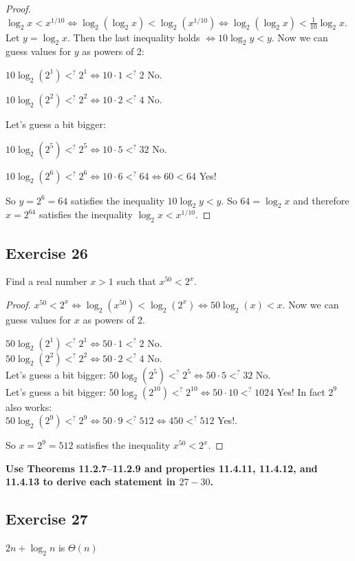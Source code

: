 \documentclass[14pt]{extarticle}
\newcommand{\cy}{\color{cyan}}
\begin{document}
\begin{proof}
    \(\log_2 x < x^{1/10} \iff \log_2(\log_2 x) < \log_2(x^{1/10}) \iff \log_2(\log_2 x) < \frac{1}{10}\log_2 x\). Let \(y =
    \log_2 x\). Then the last inequality holds \(\iff 10 \log_2 y < y\). Now we can guess values for \(y\) as powers of 2:

    \(10 \log_2(2^1) <^? 2^1 \iff 10 \cdot 1 <^? 2\) No.

    \(10 \log_2(2^2) <^? 2^2 \iff 10 \cdot 2 <^? 4\) No.

    Let's guess a bit bigger:

    \(10 \log_2(2^5) <^? 2^5 \iff 10 \cdot 5 <^? 32\) No.

    \(10 \log_2(2^6) <^? 2^6 \iff 10 \cdot 6 <^? 64 \iff 60 < 64\) Yes!

    So \(y = 2^6 = 64\) satisfies the inequality \(10 \log_2 y < y\). So \(64 = \log_2 x\) and therefore \(x = 2^{64}\)
    satisfies the inequality \(\log_2 x < x^{1/10}\).
\end{proof}

\subsection{Exercise 26}
Find a real number \(x > 1\) such that \(x^{50} < 2^x\).

\begin{proof}
    \(x^{50} < 2^x \iff \log_2(x^{50}) < \log_2(2^x) \iff 50 \log_2(x) < x\). Now we can guess values for \(x\) as powers
    of 2.

    \(50 \log_2(2^1) <^? 2^1 \iff 50 \cdot 1 <^? 2\) No. \\
    \(50 \log_2(2^2) <^? 2^2 \iff 50 \cdot 2 <^? 4\) No. \\
    Let's guess a bit bigger:
    \(50 \log_2(2^5) <^? 2^5 \iff 50 \cdot 5 <^? 32\) No. \\
    Let's guess a bit bigger:
    \(50 \log_2(2^{10}) <^? 2^{10} \iff 50 \cdot 10 <^? 1024\) Yes! In fact \(2^9\) also works: \\
    \(50 \log_2(2^9) <^? 2^9 \iff 50 \cdot 9 <^? 512 \iff 450 <^? 512\) Yes!.

    So \(x = 2^9 = 512\) satisfies the inequality \(x^{50} < 2^x\).
\end{proof}

{\bf \cy Use Theorems 11.2.7–11.2.9 and properties 11.4.11, 11.4.12, and 11.4.13 to derive each statement in \(27-30\).}

\subsection{Exercise 27}
\(2n + \log_2 n\) is \(\Theta(n)\)
\end{document}
